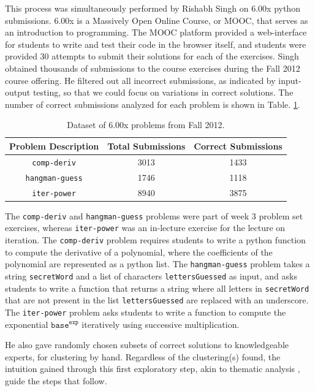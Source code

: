 \documentclass[12pt]{article}
\newcommand\tabhead[1]{\small\textbf{#1}}
\newcommand\codevar[1]{\texttt{#1}}
\begin{document}
This process was simultaneously performed by Rishabh Singh on 6.00x python submissions. 6.00x is a Massively Open Online Course, or MOOC, that serves as an introduction to programming. The MOOC platform provided a web-interface for students to write and test their code in the browser itself, and students were provided 30 attempts to submit their solutions for each of the exercises. Singh obtained thousands of submissions to the course exercises during the Fall 2012 course offering. He filtered out all incorrect submissions, as indicated by input-output testing, so that we could focus on variations in correct solutions. The number of correct submissions analyzed for each problem is shown in Table. \ref{table-edx-probs}. 

\begin{table}
\begin{tabular} {|c|c|c|}
\hline
\tabhead{Problem Description} & \tabhead{Total Submissions} & \tabhead {Correct Submissions} \\ \hline
\codevar{comp-deriv} & 3013 & 1433 \\ \hline
\codevar{hangman-guess} & 1746 & 1118 \\ \hline
\codevar{iter-power} & 8940 & 3875 \\ \hline
\end{tabular}
\caption{Dataset of 6.00x problems from Fall 2012.}
\label{table-edx-probs}
\end{table}

The \codevar{comp-deriv} and \codevar{hangman-guess} problems were part of week 3 problem set exercises, whereas \codevar{iter-power} was an in-lecture exercise for the lecture on iteration. The \codevar{comp-deriv} problem requires students to write a python function to compute the derivative of a polynomial, where the coefficients of the polynomial are represented as a python list. The \codevar{hangman-guess} problem takes a string \codevar{secretWord} and a list of characters \codevar{lettersGuessed} as input, and asks students to write a function that returns a string where all letters in \codevar{secretWord} that are not present in the list \codevar{lettersGuessed} are replaced with an underscore. The \codevar{iter-power} problem asks students to write a function to compute the exponential $\codevar{base}^\codevar{exp}$ iteratively using successive multiplication.

He also gave randomly chosen subsets of correct solutions to knowledgeable experts, for clustering by hand. Regardless of the clustering(s) found, the intuition gained through this first exploratory step, akin to thematic analysis \cite{thematic06}, guide the steps that follow.
\end{document}
